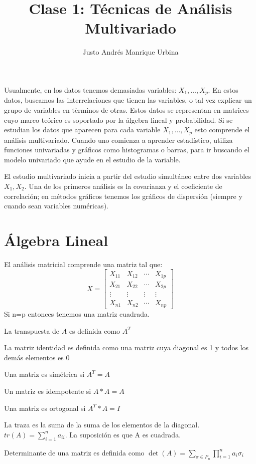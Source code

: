 \documentclass{article}
\title{Clase 1: Técnicas de Análisis Multivariado}
\author{Justo Andrés Manrique Urbina}
\begin{document}
\maketitle
Usualmente, en los datos tenemos demasiadas variables: $X_{1},\ldots,X_{p}$. En estos datos, buscamos las interrelaciones que tienen las variables, o tal vez explicar un grupo de variables en tèrminos de otras. Estos datos se representan en matrices cuyo marco teórico es soportado por la álgebra lineal y probabilidad. Si se estudian los datos que aparecen para cada variable $X_{1},\ldots,X_{p}$ esto comprende el análisis multivariado. Cuando uno comienza a aprender estadístico, utiliza funciones univariadas y gráficos como histogramas o barras, para ir buscando el modelo univariado  que ayude en el estudio de la variable.

El estudio multivariado inicia a partir del estudio simultáneo entre dos variables $X_{1}, X_{2}$. Una de los primeros análisis es la covarianza y el coeficiente de correlación; en métodos gráficos tenemos los gráficos de dispersión (siempre y cuando sean variables numéricas).
\section{Álgebra Lineal}
El análisis matricial comprende una matriz tal que:
\[
X= 
\begin{bmatrix}
X_{11} & X_{12} & \cdots & X_{1p} \\
X_{21} & X_{22} & \cdots & X_{2p} \\
\vdots & \vdots & \vdots & \vdots \\
X_{n1} & X_{n2} & \cdots & X_{np}
\end{bmatrix}
\]
Si n=p entonces tenemos una matriz cuadrada.

La transpuesta de $A$ es definida como $A^{T}$

La matriz identidad es definida como una matriz cuya diagonal es 1 y todos los demás elementos es 0

Una matriz es simétrica si $A^{T}=A$

Un matriz es idempotente si $A * A = A$

Una matriz es ortogonal si $A^{T} * A = I$

La traza es la suma de la suma de los elementos de la diagonal. $tr(A) = \sum_{i=1}^{n}a_{ii}$. La suposición es que A es cuadrada.

Determinante de una matriz es definida como $\det(A) = \sum_{\sigma \in P_{n}}\prod_{i=1}^{n} a_{i} \sigma_{i}$
\end{document}
